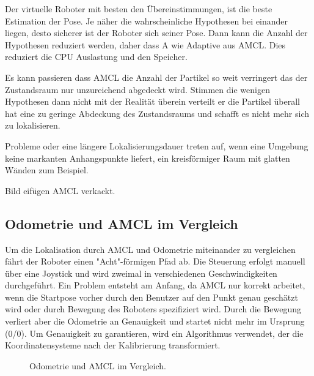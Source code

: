 \documentclass[11pt,a4paper]{article}
\begin{document}
{Der virtuelle Roboter  mit besten den \"Ubereinstimmungen, ist die beste Estimation der Pose.
Je n\"aher die wahrscheinliche Hypothesen bei einander liegen, desto sicherer ist der Roboter sich seiner Pose. Dann kann die Anzahl der Hypothesen reduziert werden, daher dass A wie Adaptive aus AMCL. Dies reduziert die CPU Auslastung und den Speicher. 

Es kann passieren dass AMCL die Anzahl der Partikel so weit verringert das der Zustandsraum nur unzureichend abgedeckt wird. Stimmen die wenigen Hypothesen dann nicht mit der Realität überein verteilt er die Partikel überall hat eine zu geringe Abdeckung des Zustandsraums und schafft es nicht mehr sich zu lokalisieren.

Probleme oder eine l\"angere Lokalisierungsdauer treten auf, wenn eine Umgebung keine markanten Anhangspunkte liefert, ein kreisf\"ormiger Raum mit glatten W\"anden zum Beispiel. 

Bild eifügen AMCL verkackt.

\subsection{Odometrie und AMCL im Vergleich}
Um die Lokalisation durch AMCL und Odometrie miteinander zu vergleichen f\"ahrt der Roboter einen "Acht"-f\"ormigen Pfad ab. Die Steuerung erfolgt manuell \"uber eine Joystick und wird zweimal in verschiedenen Geschwindigkeiten durchgef\"uhrt. Ein Problem entsteht am Anfang, da AMCL nur korrekt arbeitet, wenn die Startpose vorher durch den Benutzer auf den Punkt genau gesch\"atzt wird oder durch Bewegung des Roboters spezifiziert wird. Durch die Bewegung verliert aber die Odometrie an Genauigkeit und startet nicht mehr im Ursprung (0/0). Um Genauigkeit zu garantieren, wird ein Algorithmus verwendet, der die Koordinatensysteme nach der Kalibrierung transformiert.

\begin{figure}[h]
	\centering
	\par\medskip
	\caption{ Odometrie und AMCL im Vergleich. }
\end{figure}




}
\end{document}
